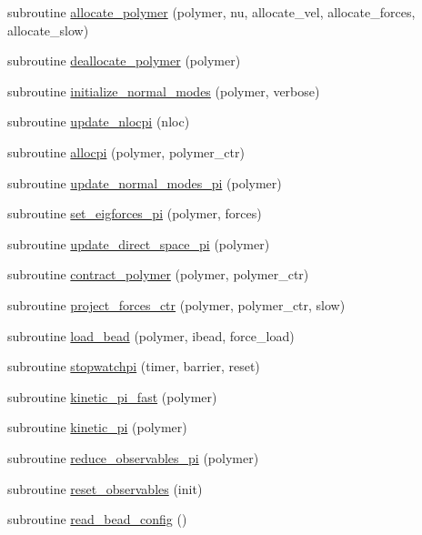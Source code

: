 \begin{DoxyCompactItemize}
\item 
subroutine \hyperlink{classbeads_a2c832b111c1927ac08f1ad3fcc183f41}{allocate\-\_\-polymer} (polymer, nu, allocate\-\_\-vel, allocate\-\_\-forces, allocate\-\_\-slow)
\item 
subroutine \hyperlink{classbeads_a4ecb45fa6d8b5818c3fb23ac2d28a625}{deallocate\-\_\-polymer} (polymer)
\item 
subroutine \hyperlink{classbeads_aff4e6a4e0f39e934a27fbb328dd10528}{initialize\-\_\-normal\-\_\-modes} (polymer, verbose)
\item 
subroutine \hyperlink{classbeads_a5f3e1c77b8ee4e8c1798aa78dd0ee764}{update\-\_\-nlocpi} (nloc)
\item 
subroutine \hyperlink{classbeads_aa5bad6293ab24d32ee9cdbd9205eef37}{allocpi} (polymer, polymer\-\_\-ctr)
\item 
subroutine \hyperlink{classbeads_ae029bda525facbe5609e7de9f99aa81e}{update\-\_\-normal\-\_\-modes\-\_\-pi} (polymer)
\item 
subroutine \hyperlink{classbeads_a88c6edcc7757ced8d0f4afc4c72f33bb}{set\-\_\-eigforces\-\_\-pi} (polymer, forces)
\item 
subroutine \hyperlink{classbeads_a92abf26b9c7bce34f7c67a8fbc44f2ab}{update\-\_\-direct\-\_\-space\-\_\-pi} (polymer)
\item 
subroutine \hyperlink{classbeads_a29cc348995807889f54007bb1408f3b6}{contract\-\_\-polymer} (polymer, polymer\-\_\-ctr)
\item 
subroutine \hyperlink{classbeads_aec0c611a5b6c29e6271679ec65b5b986}{project\-\_\-forces\-\_\-ctr} (polymer, polymer\-\_\-ctr, slow)
\item 
subroutine \hyperlink{classbeads_a41bfbd88fbe8dc2a853f56aa7b492f23}{load\-\_\-bead} (polymer, ibead, force\-\_\-load)
\item 
subroutine \hyperlink{classbeads_aec37c819dd72e2a6d56274cc66052a72}{stopwatchpi} (timer, barrier, reset)
\item 
subroutine \hyperlink{classbeads_a7313420a5e576d14a013197f0e944748}{kinetic\-\_\-pi\-\_\-fast} (polymer)
\item 
subroutine \hyperlink{classbeads_a90a4bfa6583728f8b3684af06e92ef27}{kinetic\-\_\-pi} (polymer)
\item 
subroutine \hyperlink{classbeads_a9f3793d3bc6e5d6808cfb243b258fce5}{reduce\-\_\-observables\-\_\-pi} (polymer)
\item 
subroutine \hyperlink{classbeads_a19b32a373c49cdb8c808c5f6dcad7c39}{reset\-\_\-observables} (init)
\item 
subroutine \hyperlink{classbeads_a12331e6cd784de69a2c754c1c78be763}{read\-\_\-bead\-\_\-config} ()
\end{DoxyCompactItemize}

